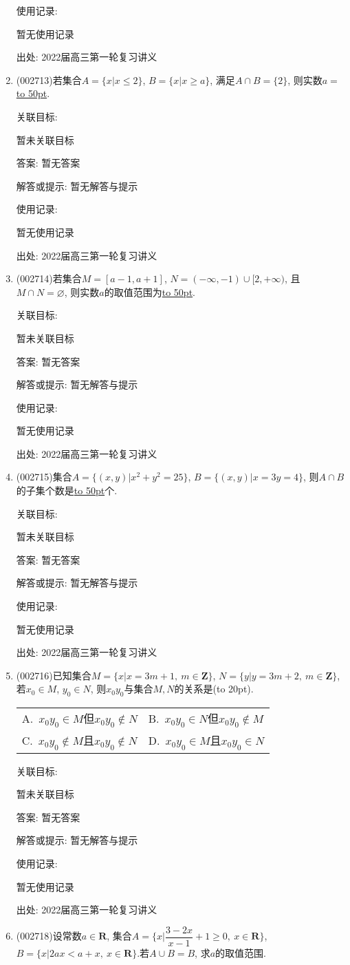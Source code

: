 \documentclass[10pt,a4paper]{article}
\newcommand{\blank}[1]{\underline{\hbox to #1pt{}}}
\newcommand{\bracket}[1]{(\hbox to #1pt{})}
\newcommand{\twoch}[4]{\par\begin{tabular}{p{.46\textwidth}p{.46\textwidth}}
A.~#1& B.~#2\\
C.~#3& D.~#4
\end{tabular}}
\begin{document}
\begin{enumerate}[1.]
使用记录:

暂无使用记录


出处: 2022届高三第一轮复习讲义
\item { (002713)}若集合$A=\{x|x\le 2\}$, $B=\{x|x\ge a\}$, 满足$A\cap B=\{2\}$, 则实数$a=$\blank{50}.


关联目标:

暂未关联目标

答案: 暂无答案

解答或提示: 暂无解答与提示

使用记录:

暂无使用记录


出处: 2022届高三第一轮复习讲义
\item { (002714)}若集合$M=[a-1,a+1]$, $N=(-\infty,-1)\cup [2,+\infty)$, 且$M\cap N=\varnothing$, 则实数$a$的取值范围为\blank{50}.


关联目标:

暂未关联目标

答案: 暂无答案

解答或提示: 暂无解答与提示

使用记录:

暂无使用记录


出处: 2022届高三第一轮复习讲义
\item { (002715)}集合$A=\{(x,y)|x^2+y^2=25\}$, $B=\{(x,y)|x=3y=4\}$, 则$A\cap B$的子集个数是\blank{50}个.


关联目标:

暂未关联目标

答案: 暂无答案

解答或提示: 暂无解答与提示

使用记录:

暂无使用记录


出处: 2022届高三第一轮复习讲义
\item { (002716)}已知集合$M=\{x|x=3m+1, \ m\in \mathbf{Z}\}$, $N=\{y|y=3m+2, \ m\in \mathbf{Z}\}$, 若$x_0\in M$, $y_0\in N$, 则$x_0y_0$与集合$M,N$的关系是\bracket{20}.
\twoch{$x_0y_0\in M$但$x_0y_0$$\notin N$}{$x_0y_0\in N$但$x_0y_0\notin M$}{$x_0y_0\notin M$且$x_0y_0\notin N$}{$x_0y_0$$\in M$且$x_0y_0\in N$}


关联目标:

暂未关联目标

答案: 暂无答案

解答或提示: 暂无解答与提示

使用记录:

暂无使用记录


出处: 2022届高三第一轮复习讲义
\item { (002718)}设常数$a\in \mathbf{R}$, 集合$A=\{x|\dfrac{3-2x}{x-1}+1 \ge 0, \ x\in \mathbf{R}\}$, $B=\{x|2ax<a+x, \ x\in \mathbf{R} \}$.若$A\cup B=B$, 求$a$的取值范围.



\end{enumerate}
\end{document}
